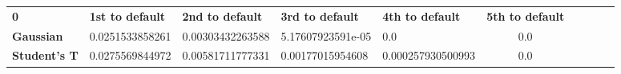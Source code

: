 \begin{center}
 \begin{tabular}{|l|l|l|l|l|c|c|c|c|c|}
\hline
\textbf{0} & \textbf{1st to default} & \textbf{2nd to default} & \textbf{3rd to default} & \textbf{4th to default} & \textbf{5th to default}\\\hhline{|=|=|=|=|=|=|}
\textbf{Gaussian} & 0.0251533858261 & 0.00303432263588 & 5.17607923591e-05 & 0.0 & 0.0\\
\textbf{Student's T} & 0.0275569844972 & 0.00581711777331 & 0.00177015954608 & 0.000257930500993 & 0.0\\
\hline
\end{tabular}
\end{center}
